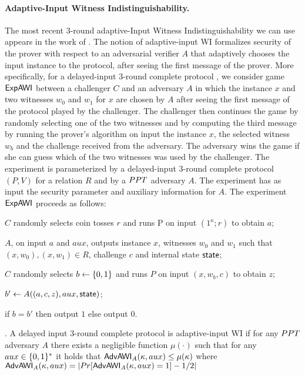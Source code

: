 {\paragraph{Adaptive-Input Witness Indistinguishability.}
The most recent $3$-round adaptive-Input Witness Indistinguishability we can use appears in the work of \cite{COSV16}. 
The notion of adaptive-input WI formalizes security of the prover with respect to an adversarial
verifier $A$ that adaptively chooses the input instance to the protocol, after seeing the first message of the prover. More specifically, for a delayed-input $3$-round complete protocol , we
consider game ${\sf ExpAWI}$ between a challenger $C$ and an adversary $A$ in which the instance $x$ and
two witnesses $w_0$ and $w_1$ for $x$ are chosen by $A$ after seeing the first message of the protocol played
by the challenger. The challenger then continues the game by randomly selecting one of the two
witnesses and by computing the third message by running the prover's algorithm on input the
instance $x$, the selected witness $w_b$ and the challenge received from the adversary. The adversary
wins the game if she can guess which of the two witnesses was used by the challenger.
The experiment is parameterized by a delayed-input $3$-round complete protocol  $(P, V)$ for a relation $R$ and by a ${\sc PPT}$
adversary $A$. The experiment has as input the security parameter and auxiliary information for $A$. 
The experiment ${\sf ExpAWI}$ proceeds as follows: 
\BE
\item $C$ randomly selects coin tosses $r$ and runs P on input $(1^\kappa; r)$ to obtain $a$;
\item $A$, on input $a$ and $aux$, outputs instance $x$, witnesses $w_0$ and $w_1$ such that
$(x,w_0), (x,w_1) \in R$, challenge $c$ and internal state $\sf state$;
\item $C$ randomly selects $b\leftarrow \{0,1\}$ and runs $P$ on input $(x,w_b, c)$ to obtain $z$;
\item $b'  \leftarrow A((a, c, z), aux, \sf state)$;
\item if $b = b'$ then output $1$ else output $0$.
\EE
 
. A delayed input $3$-round complete
protocol is adaptive-input WI if for any ${\sc PPT}$ adversary $A$ there exists a negligible function $\mu(\cdot)$ such that for any $aux \in\{0,1\}^*$ it holds that ${\sf AdvAWI}_A(\kappa, aux)\leq \mu(\kappa)$ where ${\sf AdvAWI}_A(\kappa, aux) = |Pr[{\sf AdvAWI}_A(\kappa, aux)=1]-1/2|$
\ED}
